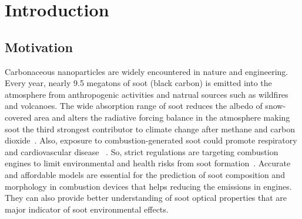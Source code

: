 \chapter{Introduction}

\section{Motivation}
Carbonaceous nanoparticles are widely encountered in nature and engineering. Every year, nearly 9.5 megatons of soot (black carbon) is emitted into the atmosphere from anthropogenic activities and natrual sources such as wildfires and volcanoes. The wide absorption range of soot reduces the albedo of snow-covered area and alters the radiative forcing balance in the atmosphere making soot the third strongest contributor to climate change after methane and carbon dioxide~\citep{myhre2014anthropogenic}. Also, exposure to combustion-generated soot could promote respiratory and cardiovascular disease ~\citep{world2013health}. So, strict regulations are targeting combustion engines to limit environmental and health risks from soot formation~\citep{integrated2019}. Accurate and affordable models are essential for the prediction of soot composition and morphology in combustion devices that helps reducing the emissions in engines. They can also provide better understanding of soot optical properties that are major indicator of soot environmental effects.

